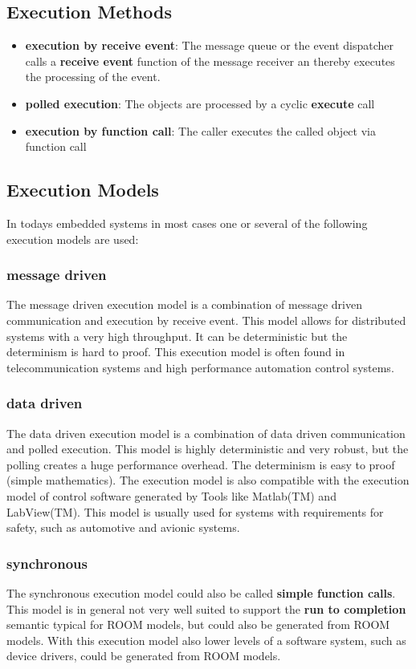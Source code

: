 \subsection{Execution Methods}

\begin{itemize}
\item \textbf{execution by receive event}: The message queue or the event dispatcher calls a 
\textbf{receive event} function of the message receiver an thereby executes the processing of the event.
\item \textbf{polled execution}: The objects are processed by a cyclic \textbf{execute} call
\item \textbf{execution by function call}: The caller executes the called object via function call
\end{itemize}

\subsection{Execution Models}

In todays embedded systems in most cases one or several of the following execution models are used:

\subsubsection{message driven}

The message driven execution model is a combination of message driven communication and execution by 
receive event.
This model allows for distributed systems with a very high throughput.
It can be deterministic but the determinism is hard to proof.
This execution model is often found in telecommunication systems and high performance automation control 
systems.

\subsubsection{data driven}

The data driven execution model is a combination of data driven communication and polled execution.
This model is highly deterministic and very robust, but the polling creates a huge performance overhead.
The determinism is easy to proof (simple mathematics). 
The execution model is also compatible with the execution model of control software generated by Tools 
like Matlab(TM) and LabView(TM).
This model is usually used for systems with requirements for safety, such as automotive and avionic systems.

\subsubsection{synchronous}

The synchronous execution model could also be called \textbf{simple function calls}. 
This model is in general not very well suited to support the \textbf{run to completion} semantic typical 
for ROOM models, but could also be generated from ROOM models. 
With this execution model also lower levels of a software system, such as device drivers, could be 
generated from ROOM models.

